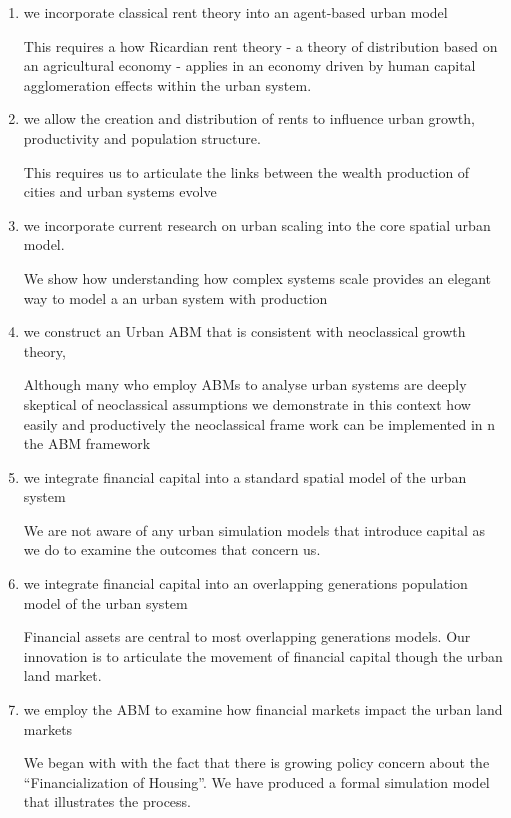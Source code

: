 \begin{enumerate}
    \item we incorporate classical rent theory into an agent-based urban model 

This requires a how Ricardian rent theory - a theory of distribution based on an agricultural economy - applies in an economy driven by human capital agglomeration effects within the urban system. 

    \item we allow the creation and distribution of rents to influence urban growth, productivity and  population structure. 
    
This requires us to articulate the links between the wealth production of cities and  urban systems evolve 
    

    \item we incorporate current research on urban scaling into the  core spatial urban model.  

We show how understanding how complex systems scale provides an elegant way to model a an urban system with production

    \item we construct an   Urban ABM that is consistent with neoclassical growth theory,

Although many  who employ ABMs to analyse urban systems are deeply skeptical of neoclassical assumptions we demonstrate in this context how easily and productively the neoclassical frame work can be implemented in n the ABM framework

    \item we integrate financial capital into a standard spatial model of the urban system

We are not aware of any urban simulation models that introduce capital as we do to examine the outcomes that concern us.
    
    \item we integrate financial capital into an overlapping generations population model of the urban system

Financial assets are central to most overlapping generations models. Our innovation is to articulate the movement of financial capital though the urban land market.
    
    \item we employ the ABM to examine how financial markets impact the urban land markets 

We began with with the fact that there is growing policy concern about the ``Financialization of  Housing''. We have produced a formal simulation model that illustrates the process. 


\end{enumerate}
